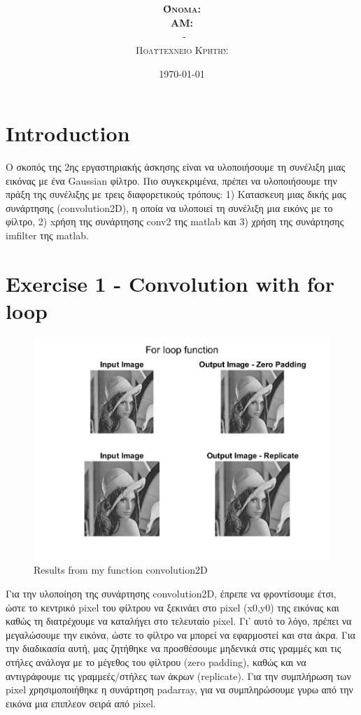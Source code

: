 \documentclass{article}
\title{\underline{\textbf{\assignmentNumber}}}
\author{\textsc{\textbf{Όνομα:}}  \studentName\\
		\textsc{\textbf{ΑΜ:}}  \studentNumber\\
		\course \ - \courseName\\ 
		\textsc{Πολυτεχνείο Κρήτης}
}
\date{\today}
\begin{document}
	\maketitle

\section*{Introduction}
	Ο σκοπός της 2ης εργαστηριακής άσκησης είναι να υλοποιήσουμε τη συνέλιξη μιας εικόνας με ένα Gaussian φίλτρο. Πιο συγκεκριμένα, πρέπει να υλοποιήσουμε την πράξη της συνέλιξης με τρεις διαφορετικούς τρόπους: 1) Κατασκευη μιας δικής μας συνάρτησης (convolution2D), η οποία να υλοποιεί τη συνέλιξη μια εικόνς με το φίλτρο, 2) xρήση της συνάρτησης conv2 της matlab και 3) χρήση της συνάρτησης imfilter της matlab.
		
\section*{Exercise 1 - Convolution with for loop}
	\begin{figure}[h!]
		\centering
		\includegraphics[width=0.8\linewidth]{./output_images/for_loop_conv.png}
		\caption{Results from my function convolution2D}
	\end{figure}
	
	\noindent
	Για την υλοποίηση της συνάρτησης convolution2D, έπρεπε να φροντίσουμε έτσι, ώστε το κεντρικό pixel του φίλτρου να ξεκινάει στο pixel (x0,y0) της εικόνας και καθώς τη διατρέχουμε να καταλήγει στο τελευταίο pixel. Γι' αυτό το λόγο, πρέπει να μεγαλώσουμε την εικόνα, ώστε το φίλτρο να μπορεί να εφαρμοστεί και στα άκρα. Για την διαδικασία αυτή, μας ζητήθηκε να προσθέσουμε μηδενικά στις γραμμές και τις στήλες ανάλογα με το μέγεθος του φίλτρου (zero padding), καθώς και να αντιγράφουμε τις γραμμεές/στήλες των άκρων (replicate). Για την συμπλήρωση των pixel χρησιμοποιήθηκε η συνάρτηση padarray, για να συμπληρώσουμε γυρω από την εικόνα μια επιπλεον σειρά από pixel.\\
	
\end{document}
